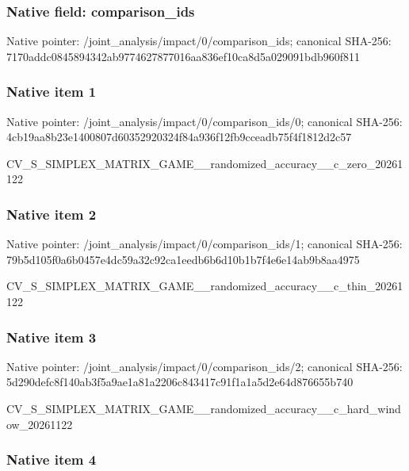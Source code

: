 \documentclass[10pt,a4paper]{article}
\begin{document}
\subsubsection{Native field: comparison\_ids}


Native pointer: /joint\_analysis/impact/0/comparison\_ids; canonical SHA-256: 7170addc0845894342ab9774\allowbreak{}627877016aa836ef10ca8d5a\allowbreak{}029091bdb960f811



\subsubsection{Native item 1}


Native pointer: /joint\_analysis/impact/0\allowbreak{}/comparison\_ids/0; canonical SHA-256: 4cb19aa8b23e1400807d6035\allowbreak{}2920324f84a936f12fb9ccea\allowbreak{}db75f4f1812d2c57


CV\_S\_SIMPLEX\_MATRIX\_GAME\allowbreak{}\_\_randomized\_accuracy\_\_c\allowbreak{}\_zero\_20261122


\subsubsection{Native item 2}


Native pointer: /joint\_analysis/impact/0\allowbreak{}/comparison\_ids/1; canonical SHA-256: 79b5d105f0a6b0457e4dc59a\allowbreak{}32c92ca1eedb6b6d10b1b7f4\allowbreak{}e6e14ab9b8aa4975


CV\_S\_SIMPLEX\_MATRIX\_GAME\allowbreak{}\_\_randomized\_accuracy\_\_c\allowbreak{}\_thin\_20261122


\subsubsection{Native item 3}


Native pointer: /joint\_analysis/impact/0\allowbreak{}/comparison\_ids/2; canonical SHA-256: 5d290defc8f140ab3f5a9ae1\allowbreak{}a81a2206c843417c91f1a1a5\allowbreak{}d2e64d876655b740


CV\_S\_SIMPLEX\_MATRIX\_GAME\allowbreak{}\_\_randomized\_accuracy\_\_c\allowbreak{}\_hard\_window\_20261122


\subsubsection{Native item 4}
\end{document}
